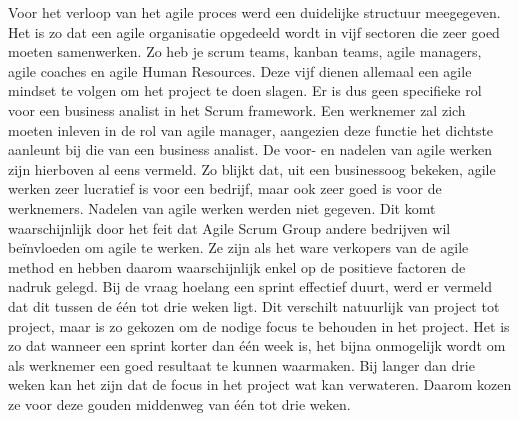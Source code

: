 \documentclass{hogent-article}
\begin{document}
	Voor het verloop van het agile proces werd een duidelijke structuur meegegeven. Het is zo dat een agile organisatie opgedeeld wordt in vijf sectoren die zeer goed moeten samenwerken. Zo heb je scrum teams, kanban teams, agile managers, agile coaches en agile Human Resources. Deze vijf dienen allemaal een agile mindset te volgen om het project te doen slagen. Er is dus geen specifieke rol voor een business analist in het Scrum framework. Een werknemer zal zich moeten inleven in de rol van agile manager, aangezien deze functie het dichtste aanleunt bij die van een business analist. \newline
	\newline
	De voor- en nadelen van agile werken zijn hierboven al eens vermeld. Zo blijkt dat, uit een businessoog bekeken, agile werken zeer lucratief is voor een bedrijf, maar ook zeer goed is voor de werknemers. Nadelen van agile werken werden niet gegeven. Dit komt waarschijnlijk door het feit dat Agile Scrum Group andere bedrijven wil beïnvloeden om agile te werken. Ze zijn als het ware verkopers van de agile method en hebben daarom waarschijnlijk enkel op de positieve factoren de nadruk gelegd.\newline
	\newline
	Bij de vraag hoelang een sprint effectief duurt, werd er vermeld dat dit tussen de één tot drie weken ligt. Dit verschilt natuurlijk van project tot project, maar is zo gekozen om de nodige focus te behouden in het project. Het is zo dat wanneer een sprint korter dan één week is, het bijna onmogelijk wordt om als werknemer een goed resultaat te kunnen waarmaken. Bij langer dan drie weken kan het zijn dat de focus in het project wat kan verwateren. Daarom kozen ze voor deze gouden middenweg van één tot drie weken.
	
\end{document}
